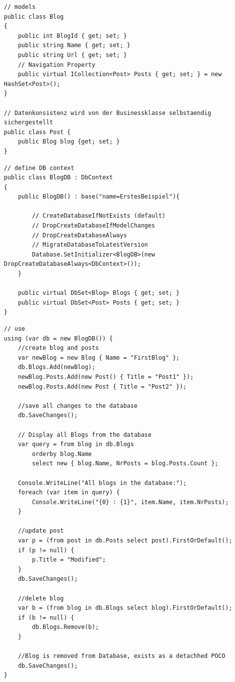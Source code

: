 \documentclass[
a4paper,
oneside,
10pt,
fleqn,
headsepline,
toc=listofnumbered, 
bibliography=totocnumbered]{scrartcl}
\begin{document}
\begin{lstlisting}	
// models
public class Blog
{
	public int BlogId { get; set; }
	public string Name { get; set; }
	public string Url { get; set; }
	// Navigation Property
	public virtual ICollection<Post> Posts { get; set; } = new HashSet<Post>();
}

// Datenkonsistenz wird von der Businessklasse selbstaendig sichergestellt
public class Post {
	public Blog blog {get; set; }
}

\end{lstlisting}

\begin{lstlisting}	
// define DB context
public class BlogDB : DbContext
{
	public BlogDB() : base("name=ErstesBeispiel"){
	
		// CreateDatabaseIfNotExists (default)
		// DropCreateDatabaseIfModelChanges
		// DropCreateDatabaseAlways
		// MigrateDatabaseToLatestVersion
		Database.SetInitializer<BlogDB>(new DropCreateDatabaseAlways<DbContext>());
	}
	
	public virtual DbSet<Blog> Blogs { get; set; }
	public virtual DbSet<Post> Posts { get; set; }
}

\end{lstlisting}

\begin{lstlisting}
// use
using (var db = new BlogDB()) {
	//create blog and posts
	var newBlog = new Blog { Name = "FirstBlog" };
	db.Blogs.Add(newBlog);
	newBlog.Posts.Add(new Post() { Title = "Post1" });
	newBlog.Posts.Add(new Post { Title = "Post2" });
	
	//save all changes to the database
	db.SaveChanges();
	
	// Display all Blogs from the database 
	var query = from blog in db.Blogs
		orderby blog.Name
		select new { blog.Name, NrPosts = blog.Posts.Count };
	
	Console.WriteLine("All blogs in the database:");
	foreach (var item in query) {
		Console.WriteLine("{0} : {1}", item.Name, item.NrPosts);
	}
	
	//update post
	var p = (from post in db.Posts select post).FirstOrDefault();
	if (p != null) {
		p.Title = "Modified";
	}
	db.SaveChanges();

	//delete blog
	var b = (from blog in db.Blogs select blog).FirstOrDefault();
	if (b != null) {
		db.Blogs.Remove(b);
	}

	//Blog is removed from Database, exists as a detachhed POCO
	db.SaveChanges();
}
\end{lstlisting}
\end{document}
